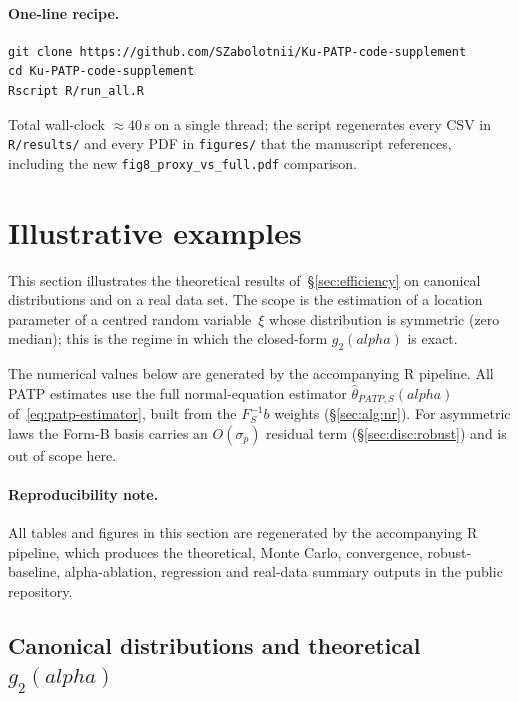 \documentclass[11pt]{article}
\def\alpha{alpha}%
\def\vec#1{#1}%
\def\mathbf#1{#1}%
\def\mathrm#1{#1}%
\theoremstyle{definition}
\newcommand{\PATP}{\mathrm{PATP}}
\providecommand{\proglang}[1]{\textsf{#1}}
\begin{document}
\paragraph{One-line recipe.}
\begin{verbatim}
git clone https://github.com/SZabolotnii/Ku-PATP-code-supplement
cd Ku-PATP-code-supplement
Rscript R/run_all.R
\end{verbatim}
Total wall-clock $\approx 40$\,s on a single thread; the script regenerates
every CSV in \texttt{R/results/} and every PDF in \texttt{figures/} that
the manuscript references, including the new
\texttt{fig8\_proxy\_vs\_full.pdf} comparison.


\section{Illustrative examples}\label{sec:illustrations}

This section illustrates the theoretical results of~\S\ref{sec:efficiency} on
canonical distributions and on a real data set. The scope is
the estimation of a location parameter of a centred random variable~$\xi$ whose
distribution is symmetric (zero median); this is the regime in which the
closed-form $g_2(\alpha)$ is exact.

The numerical values below are generated by the accompanying \proglang{R}
pipeline. All PATP estimates use the full normal-equation estimator
$\hat\theta_{\PATP,S}(\alpha)$ of~\eqref{eq:patp-estimator}, built from the
$\mathbf{F}_S^{-1}\vec b$ weights (\S\ref{sec:alg:nr}). For asymmetric laws the Form-B basis
carries an $O(\sigma_p)$ residual term (\S\ref{sec:disc:robust}) and is out of
scope here.

\paragraph{Reproducibility note.}
All tables and figures in this section are regenerated by the accompanying
\proglang{R} pipeline, which produces the theoretical, Monte Carlo, convergence,
robust-baseline, alpha-ablation, regression and real-data summary outputs in the
public repository.

\subsection[Canonical distributions and theoretical g2(alpha)]{Canonical distributions and theoretical $g_2(\alpha)$}\label{sec:ill:canonical}
\end{document}
